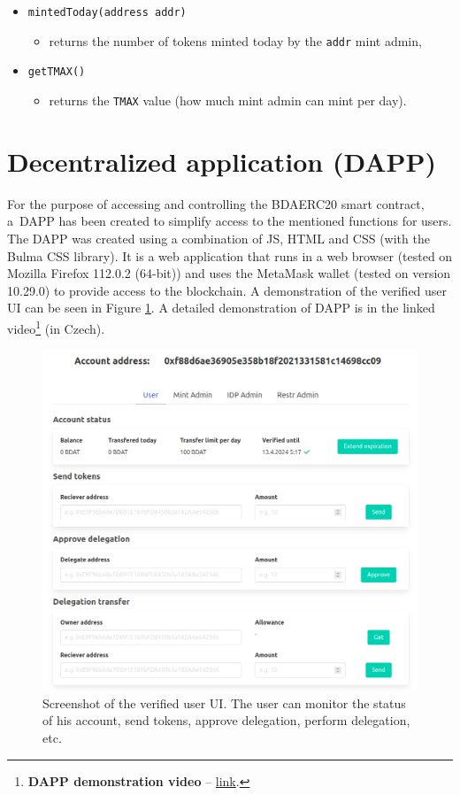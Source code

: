 \documentclass[12pt]{article}
\begin{document}
\begin{itemize}
    \item \texttt{mintedToday(address addr)}
        \begin{itemize}
            \item[] returns the number of tokens minted today by the \texttt{addr} mint admin,  
        \end{itemize}
    \item \texttt{getTMAX()}
        \begin{itemize}
            \item[] returns the \texttt{TMAX} value (how much mint admin can mint per day).
        \end{itemize}
\end{itemize}

\section{Decentralized application (DAPP)}
For the purpose of accessing and controlling the BDAERC20 smart contract, a~DAPP has been created to simplify access to the mentioned functions for users. The DAPP was created using a combination of JS, HTML and CSS (with the Bulma \cite{bulma} CSS library). It is a web application that runs in a web browser (tested on Mozilla Firefox 112.0.2 (64-bit)) and uses the MetaMask wallet (tested on version 10.29.0) to provide access to the blockchain. A demonstration of the verified user UI can be seen in Figure \ref{user}. A detailed demonstration of DAPP is in the linked video\footnote{\textbf{DAPP demonstration video} -- \href{https://drive.google.com/file/d/1e-1nz6NPWf7WG1fHD7mfNYaYF5ugZXVR/view?usp=sharing}{link}.} (in Czech).

\begin{figure}[h]\centering
  \centering
  \includegraphics[width=1\linewidth]{images/user-dapp.png}
  \caption{Screenshot of the verified user UI. The user can monitor the status of his account, send tokens, approve delegation, perform delegation, etc.}
  \label{user}
\end{figure}
\end{document}

